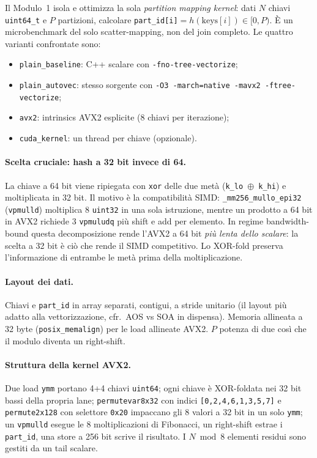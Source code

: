 \documentclass[11pt,a4paper]{article}
\theoremstyle{remark}
\begin{document}
Il Modulo~1 isola e ottimizza la sola \emph{partition mapping kernel}: dati $N$ chiavi \texttt{uint64\_t} e $P$ partizioni, calcolare \texttt{part\_id[i]}$=h(\text{keys}[i])\in[0,P)$. \`E un microbenchmark del solo scatter-mapping, non del join completo. Le quattro varianti confrontate sono:

\begin{itemize}
  \item \texttt{plain\_baseline}: C++ scalare con \texttt{-fno-tree-vectorize};
  \item \texttt{plain\_autovec}: stesso sorgente con \texttt{-O3 -march=native -mavx2 -ftree-vectorize};
  \item \texttt{avx2}: intrinsics AVX2 esplicite (8 chiavi per iterazione);
  \item \texttt{cuda\_kernel}: un thread per chiave (opzionale).
\end{itemize}

\paragraph{Scelta cruciale: hash a 32 bit invece di 64.} La chiave a 64 bit viene ripiegata con \texttt{xor} delle due met\`a (\texttt{k\_lo $\oplus$ k\_hi}) e moltiplicata in 32 bit. Il motivo \`e la compatibilit\`a SIMD: \texttt{\_mm256\_mullo\_epi32} (\texttt{vpmulld}) moltiplica 8 \texttt{uint32} in una sola istruzione, mentre un prodotto a 64 bit in AVX2 richiede 3 \texttt{vpmuludq} pi\`u shift e add per elemento. In regime bandwidth-bound questa decomposizione rende l'AVX2 a 64 bit \emph{pi\`u lenta dello scalare}: la scelta a 32 bit \`e ci\`o che rende il SIMD competitivo. Lo XOR-fold preserva l'informazione di entrambe le met\`a prima della moltiplicazione.

\paragraph{Layout dei dati.} Chiavi e \texttt{part\_id} in array separati, contigui, a stride unitario (il layout pi\`u adatto alla vettorizzazione, cfr.\ AOS vs SOA in dispensa). Memoria allineata a 32 byte (\texttt{posix\_memalign}) per le load allineate AVX2. $P$ potenza di due cos\`i che il modulo diventa un right-shift.

\paragraph{Struttura della kernel AVX2.} Due load \texttt{ymm} portano 4+4 chiavi \texttt{uint64}; ogni chiave \`e XOR-foldata nei 32 bit bassi della propria lane; \texttt{permutevar8x32} con indici \texttt{[0,2,4,6,1,3,5,7]} e \texttt{permute2x128} con selettore \texttt{0x20} impaccano gli 8 valori a 32 bit in un solo \texttt{ymm}; un \texttt{vpmulld} esegue le 8 moltiplicazioni di Fibonacci, un right-shift estrae i \texttt{part\_id}, una store a 256 bit scrive il risultato. I $N\bmod 8$ elementi residui sono gestiti da un tail scalare.
\end{document}
